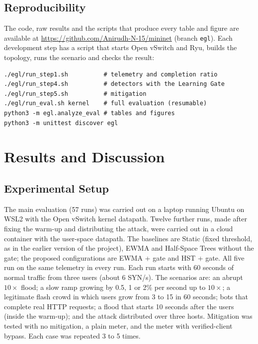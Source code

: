 \documentclass[12pt,a4paper,oneside]{report}
\begin{document}
\section{Reproducibility}
The code, raw results and the scripts that produce every table and figure are available at \url{https://github.com/Anirudh-N-15/mininet} (branch \texttt{egl}). Each development step has a script that starts Open vSwitch and Ryu, builds the topology, runs the scenario and checks the result:
\begin{lstlisting}[caption={Running the steps and the full evaluation}]
./egl/run_step1.sh          # telemetry and completion ratio
./egl/run_step4.sh          # detectors with the Learning Gate
./egl/run_step5.sh          # mitigation
./egl/run_eval.sh kernel    # full evaluation (resumable)
python3 -m egl.analyze_eval # tables and figures
python3 -m unittest discover egl
\end{lstlisting}

\chapter{Results and Discussion}
\section{Experimental Setup}
The main evaluation (57 runs) was carried out on a laptop running Ubuntu on WSL2 with the Open vSwitch kernel datapath. Twelve further runs, made after fixing the warm-up and distributing the attack, were carried out in a cloud container with the user-space datapath. The baselines are Static (fixed threshold, as in the earlier version of the project), EWMA and Half-Space Trees without the gate; the proposed configurations are EWMA + gate and HST + gate. All five run on the same telemetry in every run. Each run starts with 60 seconds of normal traffic from three users (about 6 SYN/s). The scenarios are: an abrupt $10\times$ flood; a slow ramp growing by 0.5, 1 or 2\% per second up to $10\times$; a legitimate flash crowd in which users grow from 3 to 15 in 60 seconds; bots that complete real HTTP requests; a flood that starts 10 seconds after the users (inside the warm-up); and the attack distributed over three hosts. Mitigation was tested with no mitigation, a plain meter, and the meter with verified-client bypass. Each case was repeated 3 to 5 times.
\end{document}
